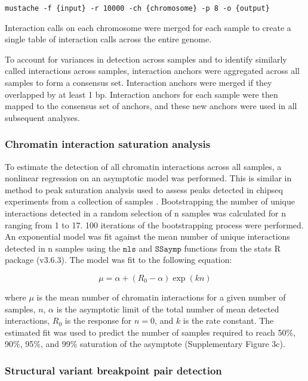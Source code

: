 \begin{lstlisting}[basicstyle=\ttfamily]
mustache -f {input} -r 10000 -ch {chromosome} -p 8 -o {output}
\end{lstlisting}

Interaction calls on each chromosome were merged for each sample to create a single table of interaction calls across the entire genome.

To account for variances in detection across samples and to identify similarly called interactions across samples, interaction anchors were aggregated across all samples to form a consensus set.
Interaction anchors were merged if they overlapped by at least 1 bp.
Interaction anchors for each sample were then mapped to the consensus set of anchors, and these new anchors were used in all subsequent analyses.

\subsubsection{Chromatin interaction saturation analysis}

To estimate the detection of all chromatin interactions across all samples, a nonlinear regression on an asymptotic model was performed.
This is similar in method to peak saturation analysis used to assess peaks detected in \gls{chipseq} experiments from a collection of samples \cite{kronTMPRSS2ERGFusion2017}.
Bootstrapping the number of unique interactions detected in a random selection of n samples was calculated for n ranging from 1 to 17.
100 iterations of the bootstrapping process were performed.
An exponential model was fit against the mean number of unique interactions detected in n samples using the $\texttt{nls}$ and $\texttt{SSaymp}$ functions from the stats R package (v3.6.3).
The model was fit to the following equation:

\begin{equation*}
  \mu = \alpha + \left( R_0 - \alpha \right) \exp \left(kn \right)
\end{equation*}

where $\mu$ is the mean number of chromatin interactions for a given number of samples, $n$, $\alpha$ is the asymptotic limit of the total number of mean detected interactions, $R_0$ is the response for $n = 0$, and $k$ is the rate constant.
The estimated fit was used to predict the number of samples required to reach 50\%, 90\%, 95\%, and 99\% saturation of the asymptote (Supplementary Figure 3c).

\subsubsection{Structural variant breakpoint pair detection}


